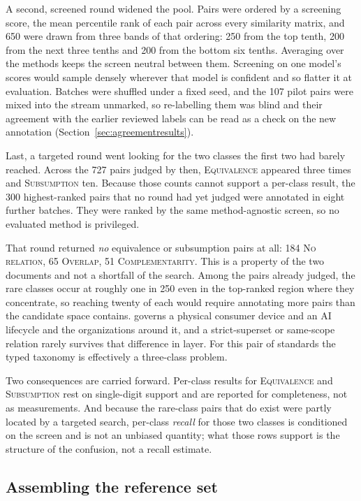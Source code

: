 A second, screened round widened the pool. Pairs were ordered by a screening
score, the mean percentile rank of each pair across every similarity matrix, and
650 were drawn from three bands of that ordering: 250 from the top tenth, 200
from the next three tenths and 200 from the bottom six tenths. Averaging over the
methods keeps the screen neutral between them. Screening on one model's scores
would sample densely wherever that model is confident and so flatter it at
evaluation. Batches were shuffled under a fixed seed, and the 107 pilot
pairs were mixed into the stream unmarked, so re-labelling them was blind and
their agreement with the earlier reviewed labels can be read as a check on the
new annotation (Section~\ref{sec:agreementresults}).

Last, a targeted round went looking for the two classes the first two had
barely reached. Across the 727 pairs judged by then, \textsc{Equivalence}
appeared three times and \textsc{Subsumption} ten. Because those counts cannot
support a per-class result, the 300 highest-ranked pairs that no round had yet
judged were annotated in eight further batches. They were ranked by the same
method-agnostic screen, so no evaluated method is privileged.

That round returned \emph{no} equivalence or subsumption pairs at all: 184
\textsc{No relation}, 65 \textsc{Overlap}, 51 \textsc{Complementarity}. This is
a property of the two documents and not a shortfall of the search. Among the
pairs already judged, the rare classes occur at roughly one in 250 even in the
top-ranked region where they concentrate, so reaching twenty of each would
require annotating more pairs than the candidate space contains. \standardA{}
governs a physical consumer device and \standardB{} an AI lifecycle and the
organizations around it, and a strict-superset or same-scope relation rarely
survives that difference in layer. For this pair of standards the typed taxonomy
is effectively a three-class problem.

Two consequences are carried forward. Per-class results for \textsc{Equivalence}
and \textsc{Subsumption} rest on single-digit support and are reported for
completeness, not as measurements. And because the rare-class pairs that do exist
were partly located by a targeted search, per-class \emph{recall} for those two
classes is conditioned on the screen and is not an unbiased quantity; what those
rows support is the structure of the confusion, not a recall estimate.

\subsection{Assembling the reference set}\label{sec:refset}

